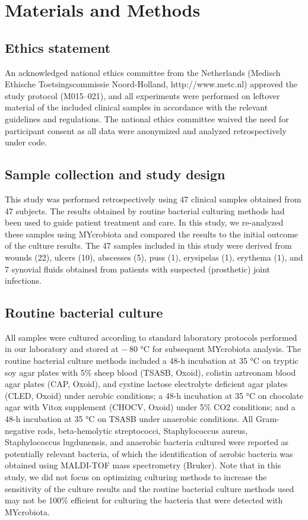 \section*{Materials and Methods}

\subsection*{Ethics statement}

An acknowledged national ethics committee from the Netherlands (Medisch Ethische Toetsingscommissie Noord-Holland, http://www.metc.nl)
approved the study protocol (M015–021), and all experiments were performed on leftover material of the included clinical samples in
accordance with the relevant guidelines and regulations. The national ethics committee waived the need for participant consent as all
data were anonymized and analyzed retrospectively under code.

\subsection*{Sample collection and study design}

This study was performed retrospectively using 47 clinical samples obtained from 47 subjects. The results obtained by routine bacterial
culturing methods had been used to guide patient treatment and care. In this study, we re-analyzed these samples using MYcrobiota and
compared the results to the initial outcome of the culture results. The 47 samples included in this study were derived from wounds (22),
ulcers (10), abscesses (5), puss (1), erysipelas (1), erythema (1), and 7 synovial fluids obtained from patients with suspected (prosthetic)
joint infections.

\subsection*{Routine bacterial culture}

All samples were cultured according to standard laboratory protocols performed in our laboratory and stored at − 80 °C for subsequent MYcrobiota
analysis. The routine bacterial culture methods included a 48-h incubation at 35 °C on tryptic soy agar plates with 5\% sheep blood (TSASB, Oxoid),
colistin aztreonam blood agar plates (CAP, Oxoid), and cystine lactose electrolyte deficient agar plates (CLED, Oxoid) under aerobic conditions;
a 48-h incubation at 35 °C on chocolate agar with Vitox supplement (CHOCV, Oxoid) under 5\% CO2 conditions; and a 48-h incubation at 35 °C on
TSASB under anaerobic conditions. All Gram-negative rods, beta-hemolytic streptococci, Staphylococcus aureus, Staphylococcus lugdunensis, and
anaerobic bacteria cultured were reported as potentially relevant bacteria, of which the identification of aerobic bacteria was obtained using
MALDI-TOF mass spectrometry (Bruker). Note that in this study, we did not focus on optimizing culturing methods to increase the sensitivity
of the culture results and the routine bacterial culture methods used may not be 100\% efficient for culturing the bacteria that were detected
with MYcrobiota.

